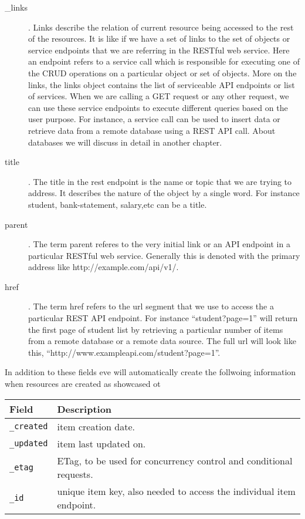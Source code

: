 \begin{description} 

\item [\_links]. Links describe the relation of current resource being
  accessed to the rest of the resources. It is like if we have a set
  of links to the set of objects or service endpoints that we are
  referring in the RESTful web service. Here an endpoint refers to a
  service call which is responsible for executing one of the CRUD
  operations on a particular object or set of objects. More on the
  links, the links object contains the list of serviceable API endpoints
  or list of services.  When we are calling a GET request or any other
  request, we can use these service endpoints to execute different
  queries based on the user purpose.  For instance, a service call can
  be used to insert data or retrieve data from a remote database using
  a REST API call. About databases we will discuss in detail in another
  chapter.

\item [title]. The title in the rest endpoint is the name or topic
  that we are trying to address. It describes the nature of the object
  by a single word. For instance student, bank-statement, salary,etc
  can be a title.

\item [parent]. The term parent referes to the very initial link or an
  API endpoint in a particular RESTful web service. Generally this is
  denoted with the primary address like http://example.com/api/v1/.

\item [href]. The term href refers to the url segment that we use to
  access the a particular REST API endpoint. For instance
  ``student?page=1'' will return the first page of student list by
  retrieving a particular number of items from a remote database or a
  remote data source. The full url will look like this,
  ``http://www.exampleapi.com/student?page=1''.

\end{description}  

In addition to these fields eve will automatically create the
follwoing information when resources are created as showcased ot 



\begin{tabular}{ll}
Field	& Description \\
\hline
\verb|_created|	& item creation date.\\
\verb|_updated|	& item last updated on.\\
\verb|_etag|	& ETag, to be used for concurrency control and conditional requests.\\
\verb|_id|	& unique item key, also needed to access the individual item
  endpoint.\\
\end{tabular}

